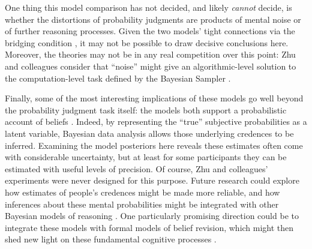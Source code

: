 \documentclass[
  english,
  man,floatsintext]{apa6}
\begin{document}
One thing this model comparison has not decided, and likely \emph{cannot} decide, is whether the distortions of probability judgments are products of mental noise or of further reasoning processes. Given the two models' tight connections via the bridging condition \autocite{zhu.etal2020}, it may not be possible to draw decisive conclusions here. Moreover, the theories may not be in any real competition over this point: Zhu and colleagues consider that ``noise'' might give an algorithmic-level solution to the computation-level task defined by the Bayesian Sampler \autocite*{zhu.etal2020}.

Finally, some of the most interesting implications of these models go well beyond the probability judgment task itself: the models both support a probabilistic account of beliefs \autocite{chater.etal2020}. Indeed, by representing the ``true'' subjective probabilities as a latent variable, Bayesian data analysis allows those underlying credences to be inferred. Examining the model posteriors here reveals these estimates often come with considerable uncertainty, but at least for some participants they can be estimated with useful levels of precision. Of course, Zhu and colleagues' \autocite*{zhu.etal2020} experiments were never designed for this purpose. Future research could explore how estimates of people's credences might be made more reliable, and how inferences about these mental probabilities might be integrated with other Bayesian models of reasoning \autocites[e.g.][]{franke.etal2016,jern.etal2014,griffiths.tenenbaum2006}. One particularly promising direction could be to integrate these models with formal models of belief revision, which might then shed new light on these fundamental cognitive processes \autocites[e.g.][]{cook.lewandowsky2016,jern.etal2014,powell.etal2018}.


\printbibliography
\end{document}

